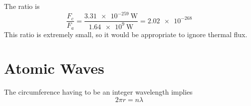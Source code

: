 \documentclass{article}
\begin{document}
The ratio is
\begin{equation}
    \frac{F_c}{F_a} = \frac{\SI{3.31e-259}{\watt}}{\SI{1.64e+9}{\watt}} = \num{2.02e-268}
\end{equation}
This ratio is extremely small, so it would be appropriate to ignore thermal flux.

\section{Atomic Waves}

The circumference having to be an integer wavelength implies
\begin{equation}
    2 \pi r = n \lambda
\end{equation}
\end{document}
